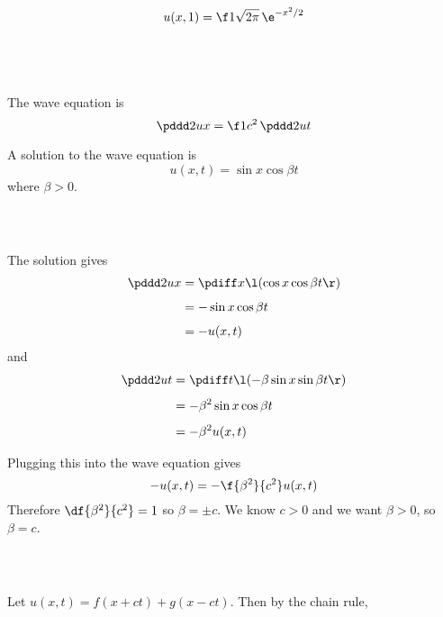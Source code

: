 \documentclass[a4paper]{article}
\begin{document}
$$u(x, 1) = \f1{\sqrt{2\pi}}\, \e^{-x^2 / 2}$$

\subsection{~}

The wave equation is
$$\pddd 2ux = \f1{c^2}\, \pddd 2ut$$

A solution to the wave equation is
$$u(x, t) = \sin x \cos \beta t$$
where $\beta > 0$.

\subsubsection{~}

The solution gives \begin{align*}
\pddd 2ux &= \pdiff x \l( \cos x \cos \beta t \r)\\[1ex]
&= -\sin x \cos \beta t\\[1ex]
&= -u(x, t)
\end{align*}
and \begin{align*}
\pddd 2ut &= \pdiff t \l( -\beta \sin x \sin \beta t \r)\\[1ex]
&= -\beta^2 \sin x \cos \beta t\\[1ex]
&= -\beta^2 u(x, t)
\end{align*}

Plugging this into the wave equation gives $$-u(x, t) = -\f{\beta^2}{c^2} u(x, t)$$
Therefore $\df{\beta^2}{c^2} = 1$ so $\beta = \pm c$. We know $c > 0$ and we want $\beta > 0$, so $\beta = c$.

\subsubsection{~}


Let $u(x, t) = f(x+ct) + g(x-ct)$. Then by the chain rule, \begin{align*}
\end{align*}


\end{document}
